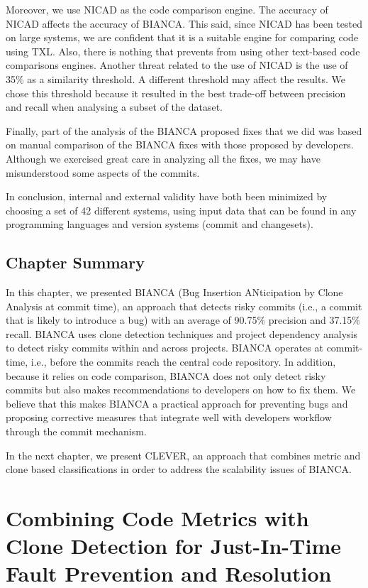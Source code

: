 \documentclass[12pt]{report}
\begin{document}
Moreover, we use NICAD as the code comparison engine. The accuracy of
NICAD affects the accuracy of BIANCA. This said, since NICAD has been
tested on large systems, we are confident that it is a suitable engine
for comparing code using TXL. Also, there is nothing that prevents from
using other text-based code comparisons engines. Another threat related
to the use of NICAD is the use of 35\% as a similarity threshold. A
different threshold may affect the results. We chose this threshold
because it resulted in the best trade-off between precision and recall
when analysing a subset of the dataset.

Finally, part of the analysis of the BIANCA proposed fixes that we did
was based on manual comparison of the BIANCA fixes with those proposed
by developers. Although we exercised great care in analyzing all the
fixes, we may have misunderstood some aspects of the commits.

In conclusion, internal and external validity have both been minimized
by choosing a set of 42 different systems, using input data that can be
found in any programming languages and version systems (commit and
changesets).

\section{Chapter Summary}\label{chapter-summary-2}

In this chapter, we presented BIANCA (Bug Insertion ANticipation by
Clone Analysis at commit time), an approach that detects risky commits
(i.e., a commit that is likely to introduce a bug) with an average of
90.75\% precision and 37.15\% recall. BIANCA uses clone detection
techniques and project dependency analysis to detect risky commits
within and across projects. BIANCA operates at commit-time, i.e., before
the commits reach the central code repository. In addition, because it
relies on code comparison, BIANCA does not only detect risky commits but
also makes recommendations to developers on how to fix them. We believe
that this makes BIANCA a practical approach for preventing bugs and
proposing corrective measures that integrate well with developers
workflow through the commit mechanism.

In the next chapter, we present CLEVER, an approach that combines metric
and clone based classifications in order to address the scalability
issues of BIANCA.

\chapter{Combining Code Metrics with Clone Detection for Just-In-Time
Fault Prevention and
Resolution}\label{combining-code-metrics-with-clone-detection-for-just-in-time-fault-prevention-and-resolution}
\end{document}
